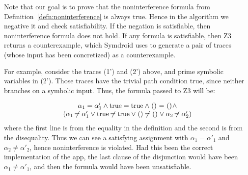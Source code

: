 \documentclass{entcs} \usepackage{entcsmacro}
\newcommand{\code}[1]{\text{\lstinline!#1!}}
\newcommand{\sfmt}[1]{\textsf{#1}}
\begin{document}
Note that our goal is to prove that the noninterference formula from
Definition~\ref{defn:noninterference} is always true. Hence in the
algorithm we negative it and check satisfiability. If the negation is
satisfiable, then noninterference formula does not hold.
If any formula is satisfiable, then Z3 returns a counterexample, which
Symdroid uses to generate a pair of traces (whose input has been
concretized) as a counterexample.

For example, consider the traces (1') and (2') above, and prime
symbolic variables in (2'). Those traces have the trivial path
condition \sfmt{true}, since neither branches on a symbolic
input. Thus, the formula passed to Z3 will be:

\begin{displaymath}
  \begin{array}{c}
    \alpha_1 = \alpha'_1 \land \code{true} = \code{true} \land \code{()} = \code{()}
    \land \\
    (\alpha_1 \neq \alpha'_1 \vee \code{true} \neq \code{true} \vee
    \code{()} \neq \code{()} \vee \alpha_2 \neq \alpha'_2)
  \end{array}
\end{displaymath}
where the first line is from the equality in the definition and the
second is from the disequality. Thus we can see a satisfying
assignment with $\alpha_1 = \alpha'_1$ and $\alpha_2 \neq \alpha'_2$,
hence noninterference is violated. Had this been the correct
implementation of the app, the last clause of the disjunction would
have been $\alpha_1 \neq \alpha'_1$, and then the formula would have
been unsatisfiable.




\end{document}
